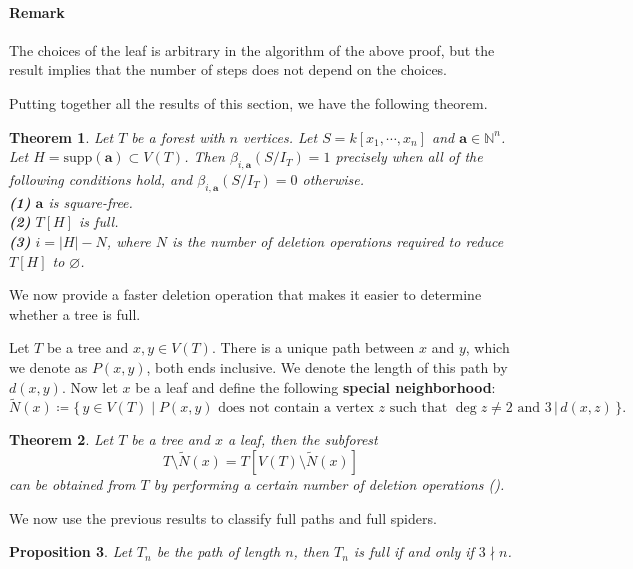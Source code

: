 \documentclass[dvipsnames,10pt]{article}
\newtheorem{theorem}{Theorem}[section]
\newtheorem{proposition}[theorem]{Proposition}
\begin{document}
\paragraph*{Remark} The choices of the leaf is arbitrary in the algorithm of the above proof, but the result implies that the number of steps does not depend on the choices.

Putting together all the results of this section, we have the following theorem.

\begin{theorem}
    Let $T$ be a forest with $n$ vertices. Let $S=k[x_1,\cdots,x_n]$ and $\mathbf{a}\in\mathbb{N}^n$. Let $H=\mathrm{supp}(\mathbf{a})\subset V(T)$. Then $\beta_{i,\mathbf{a}}(S/I_T)=1$ precisely when all of the following conditions hold, and $\beta_{i,\mathbf{a}}(S/I_T)=0$ otherwise.\\
    \textbf{(1)} $\mathbf{a}$ is square-free.\\
    \textbf{(2)} $T[H]$ is full.\\
    \textbf{(3)} $i=|H|-N$, where $N$ is the number of deletion operations required to reduce $T[H]$ to $\varnothing$.
\end{theorem}

We now provide a faster deletion operation that makes it easier to determine whether a tree is full.

Let $T$ be a tree and $x,y\in V(T)$. There is a unique path between $x$ and $y$, which we denote as $P(x,y)$, both ends inclusive. We denote the length of this path by $d(x,y)$. Now let $x$ be a leaf and define the following \textbf{special neighborhood}:
\begin{equation*}
    \tilde{N}(x) \coloneq \{\,y\in V(T)\mid P(x,y)\text{ does not contain a vertex }z\text{ such that }\deg z \neq 2\text{ and }3\,|\,d(x,z)\,\}.
\end{equation*}

\begin{theorem}
    Let $T$ be a tree and $x$ a leaf, then the subforest
    \begin{equation*}
        T\setminus \tilde{N}(x) = T[V(T)\setminus \tilde{N}(x)]
    \end{equation*}
    can be obtained from $T$ by performing a certain number of deletion operations ().
\end{theorem}

We now use the previous results to classify full paths and full spiders.

\begin{proposition}
    Let $T_n$ be the path of length $n$, then $T_n$ is full if and only if $3\nmid n$.
\end{proposition}
\end{document}

